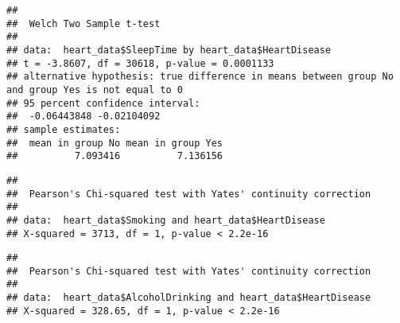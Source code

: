 \documentclass[
]{article}
\newenvironment{Shaded}{\begin{snugshade}}{\end{snugshade}}
\newcommand{\CommentTok}[1]{\textcolor[rgb]{0.56,0.35,0.01}{\textit{#1}}}
\newcommand{\FunctionTok}[1]{\textcolor[rgb]{0.00,0.00,0.00}{#1}}
\newcommand{\NormalTok}[1]{#1}
\newcommand{\SpecialCharTok}[1]{\textcolor[rgb]{0.00,0.00,0.00}{#1}}
\begin{document}
\begin{verbatim}
## 
##  Welch Two Sample t-test
## 
## data:  heart_data$SleepTime by heart_data$HeartDisease
## t = -3.8607, df = 30618, p-value = 0.0001133
## alternative hypothesis: true difference in means between group No and group Yes is not equal to 0
## 95 percent confidence interval:
##  -0.06443848 -0.02104092
## sample estimates:
##  mean in group No mean in group Yes 
##          7.093416          7.136156
\end{verbatim}

\begin{Shaded}
\end{Shaded}

\begin{verbatim}
## 
##  Pearson's Chi-squared test with Yates' continuity correction
## 
## data:  heart_data$Smoking and heart_data$HeartDisease
## X-squared = 3713, df = 1, p-value < 2.2e-16
\end{verbatim}

\begin{Shaded}
\end{Shaded}

\begin{verbatim}
## 
##  Pearson's Chi-squared test with Yates' continuity correction
## 
## data:  heart_data$AlcoholDrinking and heart_data$HeartDisease
## X-squared = 328.65, df = 1, p-value < 2.2e-16
\end{verbatim}
\end{document}
